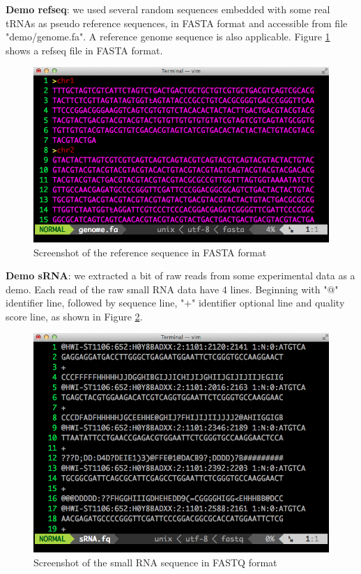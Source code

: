 \documentclass[11pt, a4paper]{article}
\begin{document}
\textbf{Demo refseq}: we used several random sequences embedded with some real tRNAs as pseudo reference sequences, in FASTA format and accessible from file "demo/genome.fa". A reference genome sequence is also applicable. Figure \ref{refseq} shows a refseq file in FASTA format.

\begin{figure}[htbp]
\begin{center}
\includegraphics[width=12cm]{refseq.png}
\caption{Screenshot of the reference sequence in FASTA format} 
\label{refseq}
\end{center}
\end{figure}

\textbf{Demo sRNA}: we extracted a bit of raw reads from some experimental data as a demo. Each read of the raw small RNA data have 4 lines. Beginning with "@" identifier line, followed by sequence line, "+" identifier optional line and quality score line, as shown in Figure \ref{fastq}.

\begin{figure}[htbp]
\begin{center}
\includegraphics[width=12cm]{fastq.png}
\caption{Screenshot of the small RNA sequence in FASTQ format} 
\label{fastq}
\end{center}
\end{figure}
\end{document}
